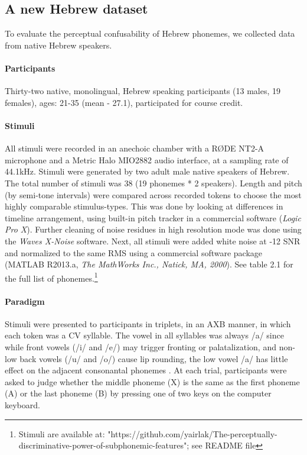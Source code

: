 \subsection{A new Hebrew dataset}
To evaluate the perceptual confusability of Hebrew phonemes, we collected data from native Hebrew speakers.

\paragraph{Participants}
Thirty-two native, monolingual, Hebrew speaking participants (13 males, 19 females), ages: 21-35 (mean - 27.1), participated for course credit.

\paragraph{Stimuli}
All stimuli were recorded in an anechoic chamber with a RØDE NT2-A microphone and a Metric Halo MIO2882 audio interface, at a sampling rate of 44.1kHz. Stimuli were generated by two adult male native speakers of Hebrew. The total number of stimuli was 38 (19 phonemes * 2 speakers). Length and pitch (by semi-tone intervals) were compared across recorded tokens to choose the most highly comparable stimulus-types. This was done by looking at differences in timeline arrangement, using built-in pitch tracker in a commercial software (\textit{Logic Pro X}). Further cleaning of noise residues in high resolution mode was done using the \textit{Waves X-Noise} software. Next, all stimuli were added white noise at -12 SNR and normalized to the same RMS using a commercial software package (MATLAB R2013.a, \textit{The MathWorks Inc., Natick, MA, 2000}). See table 2.1 for the full list of phonemes.\footnote{Stimuli are available at: "https://github.com/yairlak/The-perceptually-discriminative-power-of-subphonemic-features"; see README file}

\paragraph{Paradigm}
Stimuli were presented to participants in triplets, in an AXB manner, in which each token was a CV syllable. The vowel in all syllables was always /a/ since while front vowels (/i/ and /e/) may trigger fronting or palatalization, and non-low back vowels (/u/ and /o/) cause lip rounding, the low vowel /a/ has little effect on the adjacent consonantal phonemes \citep{ladefoged2014course}. At each trial, participants were asked to judge whether the middle phoneme (X) is the same as the first phoneme (A) or the last phoneme (B) by pressing one of two keys on the computer keyboard.

